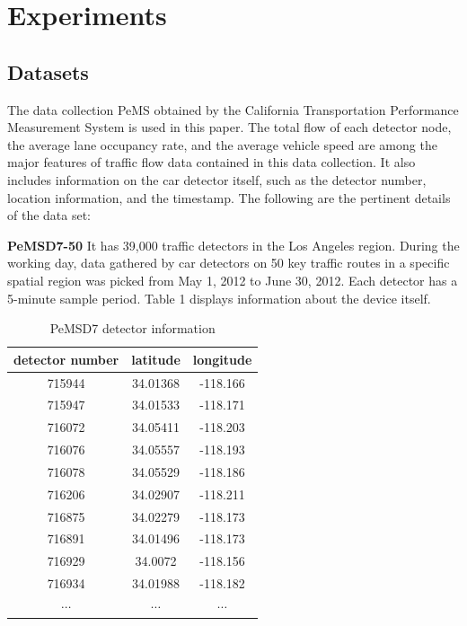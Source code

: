 \documentclass[conference]{IEEEtran}
\begin{document}
\section{Experiments}
\subsection{Datasets}
The data collection PeMS obtained by the California Transportation Performance Measurement System is used in this paper. The total flow of each detector node, the average lane occupancy rate, and the average vehicle speed are among the major features of traffic flow data contained in this data collection. It also includes information on the car detector itself, such as the detector number, location information, and the timestamp. The following are the pertinent details of the data set:
\par
\textbf{PeMSD7-50} It has 39,000 traffic detectors in the Los Angeles region. During the working day, data gathered by car detectors on 50 key traffic routes in a specific spatial region was picked from May 1, 2012 to June 30, 2012. Each detector has a 5-minute sample period. Table 1 displays information about the device itself.
\par


\begin{table}[htbp]
    \caption{PeMSD7 detector information}
    \begin{center}
    \begin{tabular}{|c|c|c|}
    \hline
        detector number & latitude &  longitude \\
    \hline    
        715944 & 34.01368 & -118.166 \\
        715947 & 34.01533 & -118.171 \\
        716072 & 34.05411 & -118.203 \\
        716076 & 34.05557 & -118.193 \\
        716078 & 34.05529 & -118.186 \\
        716206 & 34.02907 & -118.211 \\
        716875 & 34.02279 & -118.173 \\
        716891 & 34.01496 & -118.173 \\
        716929 & 34.0072 & -118.156 \\
        716934 & 34.01988 & -118.182 \\
        $\cdots$ & $\cdots$ & $\cdots$ \\
    \hline
    \end{tabular}
    \label{tab1}
    \end{center}
\end{table}
    
\end{document}
